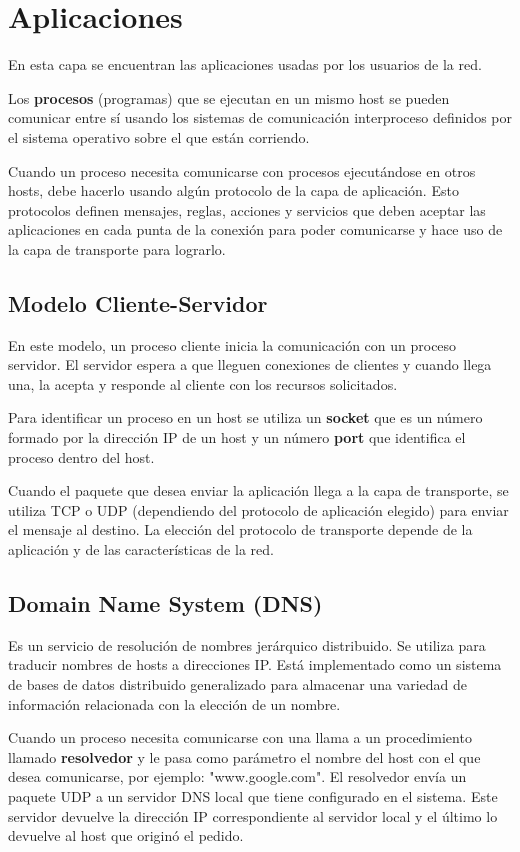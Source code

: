 \section{Aplicaciones}
En esta capa se encuentran las aplicaciones usadas por los usuarios de la red. 

Los \textbf{procesos} (programas) que se ejecutan en un mismo host se pueden comunicar entre sí usando los sistemas de comunicación interproceso definidos por el sistema operativo sobre el que están corriendo.

Cuando un proceso necesita comunicarse con procesos ejecutándose en otros hosts, debe hacerlo usando algún protocolo de la capa de aplicación. Esto protocolos definen mensajes, reglas, acciones y servicios que deben aceptar las aplicaciones en cada punta de la conexión para poder comunicarse y hace uso de la capa de transporte para lograrlo.

\subsection{Modelo Cliente-Servidor}
En este modelo, un proceso cliente inicia la comunicación con un proceso servidor. El servidor espera a que lleguen conexiones de clientes y cuando llega una, la acepta y responde al cliente con los recursos solicitados.

Para identificar un proceso en un host se utiliza un \textbf{socket} que es un número formado por la dirección IP de un host y un número \textbf{port} que identifica el proceso dentro del host. 

Cuando el paquete que desea enviar la aplicación llega a la capa de transporte, se utiliza TCP o UDP (dependiendo del protocolo de aplicación elegido) para enviar el mensaje al destino. La elección del protocolo de transporte depende de la aplicación y de las características de la red. 

\subsection{Domain Name System (DNS)}
Es un servicio de resolución de nombres jerárquico distribuido. Se utiliza para traducir nombres de hosts a direcciones IP. Está implementado como un sistema de bases de datos distribuido generalizado para almacenar una variedad de información relacionada con la elección de un nombre.

Cuando un proceso necesita comunicarse con una llama a un procedimiento llamado \textbf{resolvedor} y le pasa como parámetro el nombre del host con el que desea comunicarse, por ejemplo: "www.google.com". El resolvedor envía un paquete UDP a un servidor DNS local que tiene configurado en el sistema. Este servidor devuelve la dirección IP correspondiente al servidor local y el último lo devuelve al host que originó el pedido.

